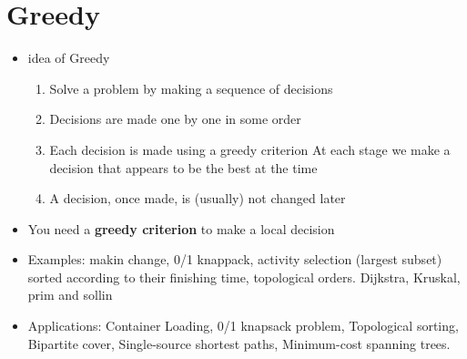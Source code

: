 \documentclass[a4paper,12pt,twoside]{book}
\begin{document}
\section{Greedy}
\begin{itemize} 

\item idea of Greedy
\begin{enumerate}
\item Solve a problem by making a sequence of decisions

\item Decisions are made one by one in some order

\item Each decision is made using a greedy criterion
At each stage we make a decision that appears to be the best at the time

\item A decision, once made, is (usually) not changed later
\end{enumerate}


\item	You need a \textbf{greedy criterion} to make a local decision 
\item 	Examples: makin change, 0/1 knappack,  activity selection (largest subset) sorted according to their finishing time, topological orders.  Dijkstra, Kruskal, prim and sollin

\item Applications: Container Loading, 0/1 knapsack problem, Topological sorting, Bipartite cover, Single-source shortest paths, Minimum-cost spanning trees. 

\end{itemize}
\end{document}
